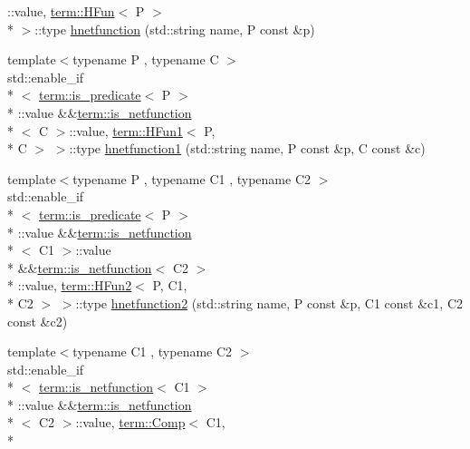\begin{DoxyCompactItemize}
\-::value, \hyperlink{structpfq__lang_1_1term_1_1HFun}{term\-::\-H\-Fun}$<$ P $>$\\*
 $>$\-::type \hyperlink{namespacepfq__lang_a78972807ac46884d5cd0719795946936}{hnetfunction} (std\-::string name, P const \&p)
\item 
{\footnotesize template$<$typename P , typename C $>$ }\\std\-::enable\-\_\-if\\*
$<$ \hyperlink{structpfq__lang_1_1term_1_1is__predicate}{term\-::is\-\_\-predicate}$<$ P $>$\\*
\-::value \&\&\hyperlink{structpfq__lang_1_1term_1_1is__netfunction}{term\-::is\-\_\-netfunction}\\*
$<$ C $>$\-::value, \hyperlink{structpfq__lang_1_1term_1_1HFun1}{term\-::\-H\-Fun1}$<$ P, \\*
C $>$ $>$\-::type \hyperlink{namespacepfq__lang_a71df0d0d66c45c40ad348a35a1781c71}{hnetfunction1} (std\-::string name, P const \&p, C const \&c)
\item 
{\footnotesize template$<$typename P , typename C1 , typename C2 $>$ }\\std\-::enable\-\_\-if\\*
$<$ \hyperlink{structpfq__lang_1_1term_1_1is__predicate}{term\-::is\-\_\-predicate}$<$ P $>$\\*
\-::value \&\&\hyperlink{structpfq__lang_1_1term_1_1is__netfunction}{term\-::is\-\_\-netfunction}\\*
$<$ C1 $>$\-::value \\*
\&\&\hyperlink{structpfq__lang_1_1term_1_1is__netfunction}{term\-::is\-\_\-netfunction}$<$ C2 $>$\\*
\-::value, \hyperlink{structpfq__lang_1_1term_1_1HFun2}{term\-::\-H\-Fun2}$<$ P, C1, \\*
C2 $>$ $>$\-::type \hyperlink{namespacepfq__lang_a0899ef1c7c1872d3d2da51cf5704ab84}{hnetfunction2} (std\-::string name, P const \&p, C1 const \&c1, C2 const \&c2)
\item 
{\footnotesize template$<$typename C1 , typename C2 $>$ }\\std\-::enable\-\_\-if\\*
$<$ \hyperlink{structpfq__lang_1_1term_1_1is__netfunction}{term\-::is\-\_\-netfunction}$<$ C1 $>$\\*
\-::value \&\&\hyperlink{structpfq__lang_1_1term_1_1is__netfunction}{term\-::is\-\_\-netfunction}\\*
$<$ C2 $>$\-::value, \hyperlink{structpfq__lang_1_1term_1_1Comp}{term\-::\-Comp}$<$ C1, \\*

\end{DoxyCompactItemize}
